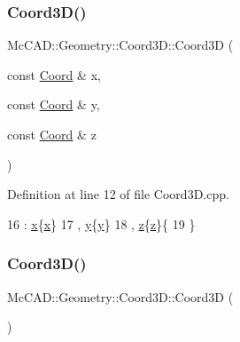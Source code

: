\subsubsection{\texorpdfstring{Coord3\+D()}{Coord3D()}\hspace{0.1cm}{\footnotesize\ttfamily [2/4]}}
{\footnotesize\ttfamily Mc\+C\+A\+D\+::\+Geometry\+::\+Coord3\+D\+::\+Coord3D (\begin{DoxyParamCaption}\item[{const \hyperlink{classMcCAD_1_1Geometry_1_1Coord}{Coord} \&}]{x,  }\item[{const \hyperlink{classMcCAD_1_1Geometry_1_1Coord}{Coord} \&}]{y,  }\item[{const \hyperlink{classMcCAD_1_1Geometry_1_1Coord}{Coord} \&}]{z }\end{DoxyParamCaption})}



Definition at line 12 of file Coord3\+D.\+cpp.


\begin{DoxyCode}
16     : \hyperlink{classMcCAD_1_1Geometry_1_1Coord3D_a82467d541e4e330484b7f4d589b433b4}{x}\{\hyperlink{classMcCAD_1_1Geometry_1_1Coord3D_a82467d541e4e330484b7f4d589b433b4}{x}\}
17     , \hyperlink{classMcCAD_1_1Geometry_1_1Coord3D_af6512434da6e0242b2606e2341abc01d}{y}\{\hyperlink{classMcCAD_1_1Geometry_1_1Coord3D_af6512434da6e0242b2606e2341abc01d}{y}\}
18     , \hyperlink{classMcCAD_1_1Geometry_1_1Coord3D_a5f89140bda6825a0a21d0064d05d9f4b}{z}\{\hyperlink{classMcCAD_1_1Geometry_1_1Coord3D_a5f89140bda6825a0a21d0064d05d9f4b}{z}\}\{
19 \}
\end{DoxyCode}
\mbox{\label{classMcCAD_1_1Geometry_1_1Coord3D_a014112083719cc49892fb1a791427fe0}} 
\subsubsection{\texorpdfstring{Coord3\+D()}{Coord3D()}\hspace{0.1cm}{\footnotesize\ttfamily [3/4]}}
{\footnotesize\ttfamily Mc\+C\+A\+D\+::\+Geometry\+::\+Coord3\+D\+::\+Coord3D (\begin{DoxyParamCaption}{ }\end{DoxyParamCaption})}

